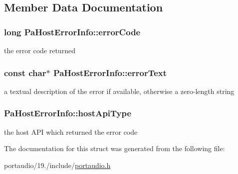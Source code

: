 \subsection{Member Data Documentation}
\hypertarget{struct_pa_host_error_info_a2ab15f358cd7f0a5e8f3d54e161a2fec}{
\subsubsection[{error\+Code}]{\setlength{\rightskip}{0pt plus 5cm}long Pa\+Host\+Error\+Info\+::error\+Code}}\label{struct_pa_host_error_info_a2ab15f358cd7f0a5e8f3d54e161a2fec}
the error code returned \hypertarget{struct_pa_host_error_info_aa40a7ed0c73b85b39563d80f7877876c}{
\subsubsection[{error\+Text}]{\setlength{\rightskip}{0pt plus 5cm}const char$\ast$ Pa\+Host\+Error\+Info\+::error\+Text}}\label{struct_pa_host_error_info_aa40a7ed0c73b85b39563d80f7877876c}
a textual description of the error if available, otherwise a zero-\/length string \hypertarget{struct_pa_host_error_info_aeadfc0e22fee75e94541876d6d7a91f7}{
\subsubsection[{host\+Api\+Type}]{ Pa\+Host\+Error\+Info\+::host\+Api\+Type}}\label{struct_pa_host_error_info_aeadfc0e22fee75e94541876d6d7a91f7}
the host A\+P\+I which returned the error code 

The documentation for this struct was generated from the following file\+:\begin{DoxyCompactItemize}
\item 
portaudio/19./include/\hyperlink{portaudio_8h}{portaudio.\+h}\end{DoxyCompactItemize}

